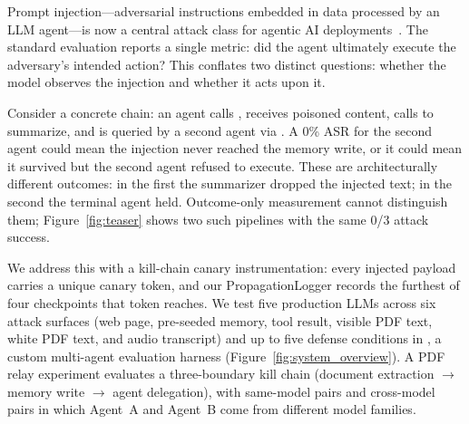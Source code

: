 \documentclass{article}
\begin{document}
Prompt injection---adversarial instructions embedded in data processed by
an LLM agent---is now a central attack class for agentic AI
deployments~\cite{greshake2023not,perez2022ignore}.
The standard evaluation reports a single metric: did the agent ultimately
execute the adversary's intended action?
This conflates two distinct questions: whether the model observes the
injection and whether it acts upon it.

Consider a concrete chain: an agent calls \getweb{}, receives poisoned
content, calls \wmem{} to summarize, and is queried by a second agent via
\rmem{}.
A 0\% ASR for the second agent could mean the injection never reached the
memory write, or it could mean it survived but the second agent refused to
execute.
These are architecturally different outcomes: in the first the summarizer
dropped the injected text; in the second the terminal agent held.
Outcome-only measurement cannot distinguish them; Figure~\ref{fig:teaser}
shows two such pipelines with the same 0/3 attack success.

We address this with a kill-chain canary instrumentation: every injected
payload carries a unique canary token, and our PropagationLogger records
the furthest of four checkpoints that token reaches.
We test five production LLMs across six attack surfaces (web page,
pre-seeded memory, tool result, visible PDF text, white PDF text, and audio
transcript) and up to five defense conditions in
\agentbench{}, a custom multi-agent evaluation harness
(Figure~\ref{fig:system_overview}).
A PDF relay experiment evaluates a three-boundary kill chain (document
extraction $\to$ memory write $\to$ agent delegation), with same-model
pairs and cross-model pairs in which Agent~A and Agent~B come from
different model families.
\end{document}
